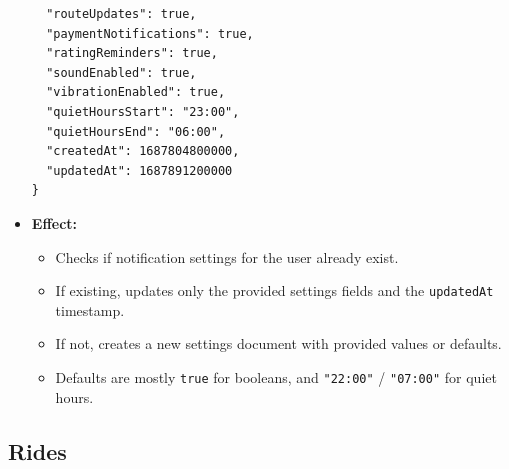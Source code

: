 \documentclass[a4paper,12pt]{article}
\begin{document}
\begin{itemize}
\begin{verbatim}
  "routeUpdates": true,
  "paymentNotifications": true,
  "ratingReminders": true,
  "soundEnabled": true,
  "vibrationEnabled": true,
  "quietHoursStart": "23:00",
  "quietHoursEnd": "06:00",
  "createdAt": 1687804800000,
  "updatedAt": 1687891200000
}
    \end{verbatim}
    \item \textbf{Effect:}
    \begin{itemize}
      \item Checks if notification settings for the user already exist.
      \item If existing, updates only the provided settings fields and the \texttt{updatedAt} timestamp.
      \item If not, creates a new settings document with provided values or defaults.
      \item Defaults are mostly \texttt{true} for booleans, and \texttt{"22:00"} / \texttt{"07:00"} for quiet hours.
    \end{itemize}
  \end{itemize}

\subsection*{Rides}
\end{document}
